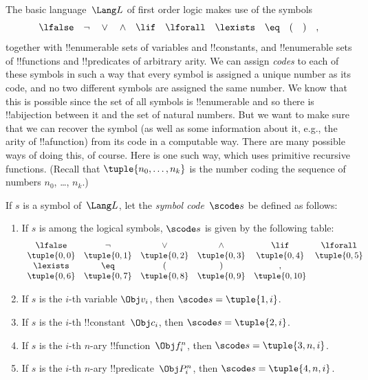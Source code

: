 \documentclass[../../../include/open-logic-section]{subfiles}
\begin{document}

The basic language~$\Lang L$ of first order logic makes use of the symbols
\[
\lfalse \quad \lnot \quad \lor \quad \land \quad \lif \quad \lforall
\quad \lexists \quad \eq \quad ( \quad ) \quad ,
\]
together with !!{enumerable} sets of variables and !!{constant}s, and
!!{enumerable} sets of !!{function}s and !!{predicate}s of arbitrary
arity.  We can assign \emph{codes} to each of these symbols in such a
way that every symbol is assigned a unique number as its code, and no
two different symbols are assigned the same number.  We know that this
is possible since the set of all symbols is !!{enumerable} and so
there is !!a{bijection} between it and the set of natural numbers.
But we want to make sure that we can recover the symbol (as well as
some information about it, e.g., the arity of !!a{function}) from its
code in a computable way.  There are many possible ways of doing this,
of course.  Here is one such way, which uses primitive recursive
functions.  (Recall that $\tuple{n_0, \dots, n_k}$ is the number
coding the sequence of numbers $n_0$, \dots, $n_k$.)

\begin{defn}
If $s$ is a symbol of~$\Lang L$, let the \emph{symbol code}~$\scode s$ be
defined as follows:
\begin{enumerate}
\item If $s$ is among the logical symbols, $\scode s$ is given by the
  following table:
\[
\begin{array}{cccccccccc}
  \lfalse & \lnot & \lor & \land & \lif & \lforall \\
\tuple{0, 0} & \tuple{0, 1} & \tuple{0, 2} & \tuple{0, 3} &
\tuple{0, 4} & \tuple{0, 5} \\
\lexists & \eq & ( & ) & ,\\
\tuple{0, 6} & \tuple{0, 7} &
\tuple{0, 8} & \tuple{0, 9} & \tuple{0, 10}
\end{array}
\]
\item If $s$ is the $i$-th variable $\Obj v_i$, then $\scode s = \tuple{1, i}$.
\item If $s$ is the $i$-th !!{constant}~$\Obj c_i$, then
  $\scode s = \tuple{2, i}$.
\item If $s$ is the $i$-th $n$-ary !!{function}~$\Obj f_i^n$, then
  $\scode s = \tuple{3, n, i}$.
\item If $s$ is the $i$-th $n$-ary !!{predicate}~$\Obj P_i^n$, then
  $\scode s = \tuple{4, n, i}$.
\end{enumerate}
\end{defn}
\end{document}

